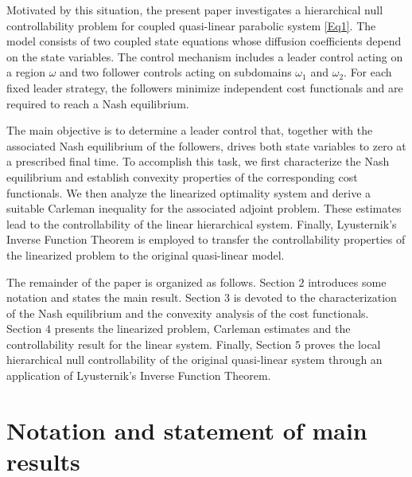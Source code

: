 \documentclass[11pt,a4paper]{amsart}
\numberwithin{equation}{section}
\begin{document}
Motivated by this situation, the present paper investigates a hierarchical null controllability problem for  coupled quasi-linear parabolic system  \eqref{Eq1}. The model consists of two coupled state equations whose diffusion coefficients depend on the state variables. The control mechanism includes a leader control acting on a region $\omega$ and two follower controls acting on  subdomains $\omega_1$ and $\omega_2$. For each fixed leader strategy, the followers minimize independent cost functionals and are required to reach a Nash equilibrium.

The main objective is to determine a leader control that, together with the associated Nash equilibrium of the followers, drives both state variables to zero at a prescribed final time. To accomplish this task, we first characterize the Nash equilibrium and establish convexity properties of the corresponding cost functionals. We then analyze the linearized optimality system and derive a suitable Carleman inequality for the associated adjoint problem. These estimates lead to the controllability of the linear hierarchical system. Finally, Lyusternik’s Inverse Function Theorem is employed to transfer the controllability properties of the linearized problem to the original quasi-linear model.

The remainder of the paper is organized as follows. Section $2$ introduces some notation and states the main result. Section $3$ is devoted to the characterization of the Nash equilibrium and the convexity analysis of the cost functionals. Section $4$ presents the linearized problem, Carleman estimates and the controllability result for the linear system. Finally, Section $5$ proves the local hierarchical null controllability of the original quasi-linear system through an application of Lyusternik’s Inverse Function Theorem.

\section{ \bf Notation and statement of  main results}\label{sec1}
    
\end{document}
